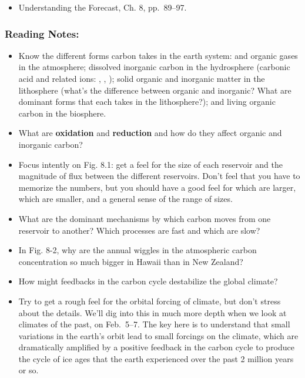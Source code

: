 \documentclass[
]{article}
\providecommand{\tightlist}{%
  \setlength{\itemsep}{0pt}\setlength{\parskip}{0pt}}
\newcommand{\COO}{\ce{CO2}}
\newcommand{\carbonic}{\ce{H2CO3}}
\newcommand{\carbonicacid}{\carbonic}
\newcommand{\carb}{\ce{CO3^2-}}
\newcommand{\bicarb}{\ce{HCO3-}}
\newcommand{\bicarbonate}{\bicarb}
\newcommand{\carbonate}{\carb}
\begin{document}
\begin{itemize}
\tightlist
\item
  Understanding the Forecast, Ch. 8, pp.~89--97.
\end{itemize}

\hypertarget{reading-notes-7}{%
\subsubsection{Reading Notes:}\label{reading-notes-7}}

\begin{itemize}
\tightlist
\item
  Know the different forms carbon takes in the earth system: \COO{} and
  organic gases in the atmosphere; dissolved inorganic carbon in the
  hydrosphere (carbonic acid and related ions: \carbonicacid{},
  \bicarbonate{}, \carbonate{}); solid organic and inorganic matter in
  the lithosphere (what's the difference between organic and inorganic?
  What are dominant forms that each takes in the lithosphere?); and
  living organic carbon in the biosphere.
\item
  What are \textbf{oxidation} and \textbf{reduction} and how do they
  affect organic and inorganic carbon?
\item
  Focus intently on Fig. 8.1: get a feel for the size of each reservoir
  and the magnitude of flux between the different reservoirs. Don't feel
  that you have to memorize the numbers, but you should have a good feel
  for which are larger, which are smaller, and a general sense of the
  range of sizes.
\item
  What are the dominant mechanisms by which carbon moves from one
  reservoir to another? Which processes are fast and which are slow?
\item
  In Fig. 8-2, why are the annual wiggles in the atmospheric carbon
  concentration so much bigger in Hawaii than in New Zealand?
\item
  How might feedbacks in the carbon cycle destabilize the global
  climate?
\item
  Try to get a rough feel for the orbital forcing of climate, but don't
  stress about the details. We'll dig into this in much more depth when
  we look at climates of the past, on Feb.~5--7. The key here is to
  understand that small variations in the earth's orbit lead to small
  forcings on the climate, which are dramatically amplified by a
  positive feedback in the carbon cycle to produce the cycle of ice ages
  that the earth experienced over the past 2 million years or so.
\end{itemize}
\end{document}
